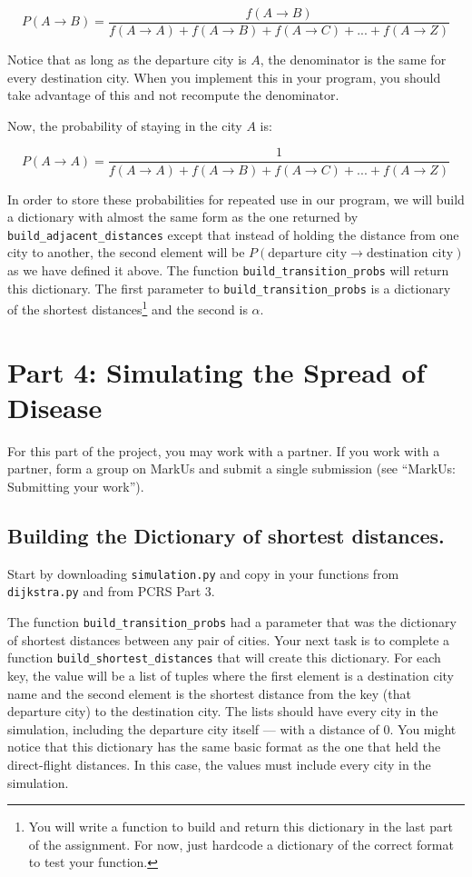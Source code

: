 \documentclass{assignment}
\begin{document}
$$P(A\rightarrow B) = \frac{f(A\rightarrow B)}{f(A\rightarrow A) + f(A\rightarrow B) + f(A\rightarrow C) + ... + f(A\rightarrow Z)} $$

Notice that as long as the departure city is $A$, the denominator is the same for every destination city.  When you implement this in your program, you should take advantage of this and not recompute the denominator. 

Now, the probability of staying in the city $A$ is:

$$P(A\rightarrow A) = \frac{1}{f(A\rightarrow A) + f(A\rightarrow B) + f(A\rightarrow C) + ... + f(A\rightarrow Z)} $$
 
In order to store these probabilities for repeated use in our program, we will build a dictionary with almost the same form as the one returned by
\verb|build_adjacent_distances| except that instead of holding the distance from one city to another, the second element will be 
$P(\text{departure city} \rightarrow \text{destination city})$ as we have defined it above. The function \verb|build_transition_probs| will return
this dictionary.   The first parameter to \verb|build_transition_probs| is a dictionary of the shortest distances\footnote{You will write a function to build and return this dictionary in the last part of the assignment. For now, just hardcode a dictionary of the correct format to test your function.} and the second is $\alpha$.  


\section*{Part 4: Simulating the Spread of Disease}

For this part of the project, you may work with a partner. If you work with a partner, form a group on MarkUs and submit a single submission (see ``MarkUs: Submitting your work''). 

\subsection*{Building the Dictionary of shortest distances.}

Start by downloading \verb|simulation.py| and copy in your functions from \verb|dijkstra.py| and from PCRS Part 3.


The function \verb|build_transition_probs| had a parameter that was the dictionary of shortest distances between any pair of cities.
Your next task is to complete a function \verb|build_shortest_distances| that will create this dictionary. For each key, the value will be a list of tuples where the first element is a destination city name and the second element is the shortest distance from the key (that departure city) to the destination city. The lists should have every city in the simulation, including the departure city itself --- with a distance of 0.  You might notice that this dictionary has the same basic format as the
one that held the direct-flight distances. In this case, the values must include every city in the simulation.
\end{document}
